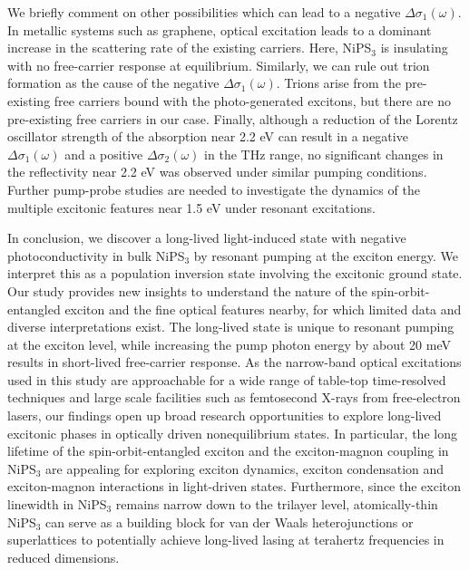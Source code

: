 \documentclass[
 reprint,
superscriptaddress,

 amsmath,amssymb,
 aps,

]{revtex4-2}
\begin{document}
We briefly comment on other possibilities which can lead to a negative $\Delta\sigma_1(\omega)$. In metallic systems such as graphene, optical excitation leads to a dominant increase in the scattering rate of the existing carriers\cite{Jnawali2013, Frenzel2014}. Here, NiPS$_3$ is insulating with no free-carrier response at equilibrium. Similarly, we can rule out trion formation as the cause of the negative $\Delta\sigma_1(\omega)$. Trions arise from the pre-existing free carriers bound with the photo-generated excitons\cite{Liu2014}, but there are no pre-existing free carriers in our case. Finally, although a reduction of the Lorentz oscillator strength of the absorption near 2.2 eV\cite{Kim2018} can result in a negative $\Delta\sigma_1(\omega)$ and a positive $\Delta\sigma_2(\omega)$ in the THz range, no significant changes in the reflectivity near 2.2 eV was observed under similar pumping conditions\cite{Ergeçen2022}. Further pump-probe studies are needed to investigate the dynamics of the multiple excitonic features near 1.5 eV under resonant excitations.

In conclusion, we discover a long-lived light-induced state with negative photoconductivity in bulk NiPS$_3$ by resonant pumping at the exciton energy. We interpret this as a population inversion state involving the excitonic ground state. Our study provides new insights to understand the nature of the spin-orbit-entangled exciton and the fine optical features nearby, for which limited data and diverse interpretations exist\cite{Kang2020,Wang2021,Klaproth2023,Jana,Kim2023,He2024,Hamad2024}. The long-lived state is unique to resonant pumping at the exciton level, while increasing the pump photon energy by about 20 meV results in short-lived free-carrier response. As the narrow-band optical excitations used in this study are approachable for a wide range of table-top time-resolved techniques and large scale facilities such as femtosecond X-rays from free-electron lasers, our findings open up broad research opportunities to explore long-lived excitonic phases in optically driven nonequilibrium states. In particular, the long lifetime of the spin-orbit-entangled exciton and the exciton-magnon coupling in NiPS$_3$ are appealing for exploring exciton dynamics, exciton condensation and exciton-magnon interactions in light-driven states. Furthermore, since the exciton linewidth in NiPS$_3$ remains narrow down to the trilayer level\cite{Wang2021}, atomically-thin NiPS$_3$ can serve as a building block for van der Waals heterojunctions or superlattices to potentially achieve long-lived lasing at terahertz frequencies in reduced dimensions.
\end{document}

